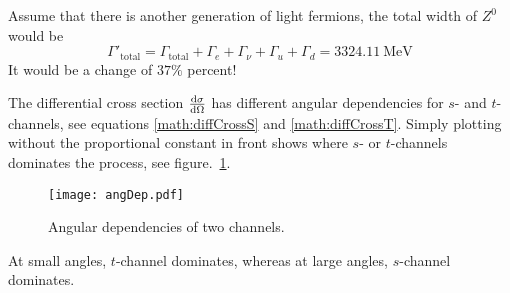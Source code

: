 Assume that there is another generation of light fermions, the total width of $Z^0$ would be
\begin{equation}
	\Gamma'_\text{total} = \Gamma_\text{total} + \Gamma_e + \Gamma_\nu + \Gamma_u + \Gamma_d = \SI{3324.11}{\mega\eV}
\end{equation}
It would be a change of $37 \%$ percent!

The differential cross section $\dv{\sigma}{\Omega}$ has different angular dependencies for $s$- and $t$-channels, see equations \eqref{math:diffCrossS} and \eqref{math:diffCrossT}. Simply plotting without the proportional constant in front shows where $s$- or $t$-channels dominates the process, see figure.~\ref{fig:angDep}.
\begin{figure}[ht]
	\centering
	\texttt{[image: angDep.pdf]}
	\caption{Angular dependencies of two channels.}%
	\label{fig:angDep}
\end{figure}
At small angles, $t$-channel dominates, whereas at large angles, $s$-channel dominates.
